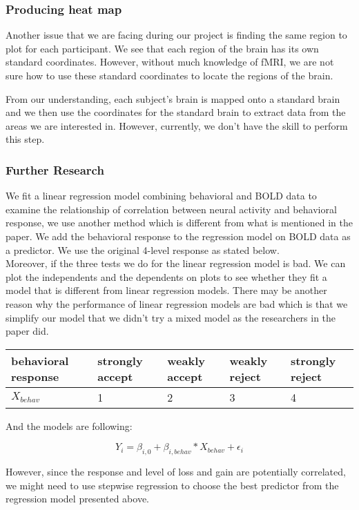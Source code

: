 \subsubsection{Producing heat map}

\indent \indent Another issue that we are facing during our project is finding 
the same region to plot for each participant. We see that each region of the 
brain has its own standard coordinates. However, without much knowledge of 
fMRI, we are not sure how to use these standard coordinates to locate the 
regions of the brain.

From our understanding, each subject's brain is mapped onto a standard brain 
and we then use the coordinates for the standard brain to extract data from 
the areas we are interested in. However, currently, we don't have the skill to 
perform this step.

\subsubsection{Further Research}

We fit a linear regression model combining behavioral and BOLD data to examine 
the relationship of correlation between neural activity and behavioral 
response, we use another method which is different from what is mentioned in 
the paper. We add the behavioral response to the regression model on BOLD data 
as a predictor. We use the original 4-level response as stated below. \\ 

Moreover, if the three tests we do for the linear regression model is bad. We 
can plot the independents and the dependents on plots to see whether they fit a 
model that is different from linear regression models. There may be another 
reason why the performance of linear regression models are bad which is that we 
simplify our model that we didn’t try a mixed model as the researchers in the 
paper did.

\begin{tabular}{lllll}
\hline
behavioral response & strongly accept & weakly accept & weakly reject & 
strongly reject\\ 
\hline
$X_{behav}$ & 1 & 2 & 3 & 4 \\
\hline
\end{tabular}

And the models are following:

\begin{equation}
Y_{i} = \beta_{i, 0} + \beta_{i, behav} * X_{behav} + \epsilon_i
\end{equation}

However, since the response and level of loss and gain are potentially 
correlated, we might need to use stepwise regression to choose the best 
predictor from the regression model presented above.

